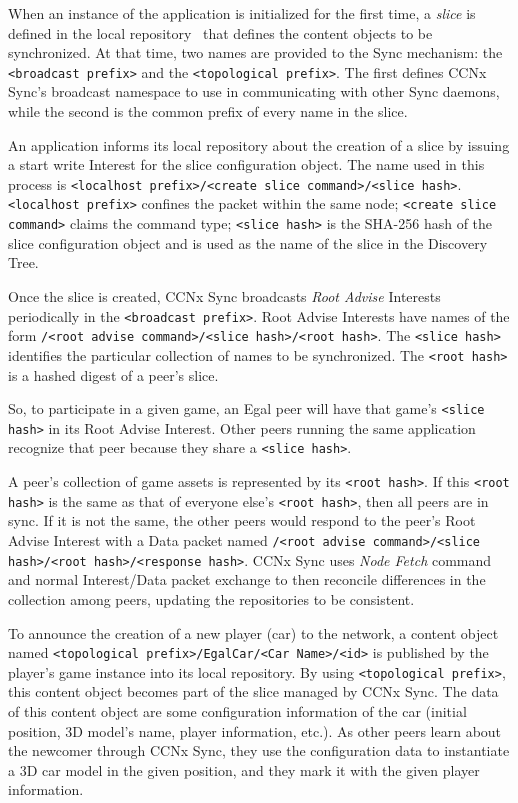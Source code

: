 \documentclass{article}
\begin{document}
When an instance of the application is initialized for the first time, a \emph{slice} is defined in the local repository~\cite{CCNxCS} that defines the content objects to be synchronized. At that time, two names are provided to the Sync mechanism: the \texttt{<broadcast prefix>} and the \texttt{<topological prefix>}. The first defines CCNx Sync's broadcast namespace to use in communicating with other Sync daemons, while the second is the common prefix of every name in the slice. 

An application informs its local repository about the creation of a slice by issuing a start write Interest for the slice configuration object. The name used in this process is \texttt{<localhost prefix>/<create slice command>/<slice hash>}. \texttt{<localhost prefix>} confines the packet within the same node; \texttt{<create slice command>} claims the command type; \texttt{<slice hash>} is the SHA-256 hash of the slice configuration object and is used as the name of the slice in the Discovery Tree.

Once the slice is created, CCNx Sync broadcasts \emph{Root Advise} Interests periodically in the \texttt{<broadcast prefix>}. Root Advise Interests have names of the form \texttt{/<root advise command>/<slice hash>/<root hash>}. The \texttt{<slice hash>} identifies the particular collection of names to be synchronized.  The \texttt{<root hash>} is a hashed digest of a peer's slice. 

So, to participate in a given game, an Egal peer will have that game's \texttt{<slice hash>} in its Root Advise Interest.  Other peers running the same application recognize that peer  because they share a \texttt{<slice hash>}.

A peer's collection of game assets is represented by its \texttt{<root hash>}. If this \texttt{<root hash>} is the same as that of everyone else's \texttt{<root hash>}, then all peers are in sync. If it is not the same, the other peers would respond to the peer's Root Advise Interest with a Data packet named \texttt{/<root advise command>/<slice hash>/<root hash>/<response hash>}. CCNx Sync uses \emph{Node Fetch} command and normal Interest/Data packet exchange to then reconcile differences in the collection among peers, updating the repositories to be consistent.

To announce the creation of a new player (car) to the network, a content object named \texttt{<topological prefix>/EgalCar/<Car Name>/<id>} is published by the player's game instance into its local repository. By using \texttt{<topological prefix>}, this content object becomes part of the slice managed by CCNx Sync. The data of this content object are some configuration information of the car (initial position, 3D model's name, player information, etc.). As other peers learn about the newcomer through CCNx Sync, they use the configuration data to instantiate a 3D car model in the given position, and they mark it with the given player information. 
\end{document}

